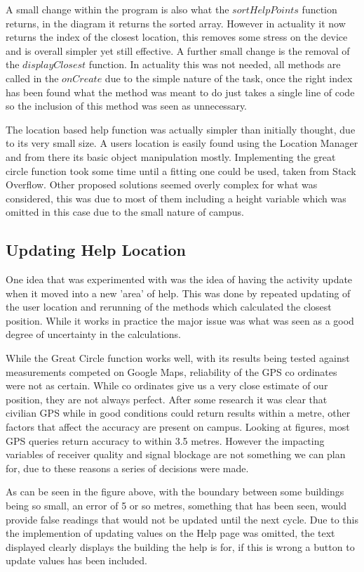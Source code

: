 A small change within the program is also what the $sortHelpPoints$ function returns, in the diagram it returns the sorted array. However in actuality it now returns the index of the closest location, this removes some stress on the device and is overall simpler yet still effective. A further small change is the removal of the $displayClosest$ function. In actuality this was not needed, all methods are called in the $onCreate$ due to the simple nature of the task, once the right index has been found what the method was meant to do just takes a single line of code so the inclusion of this method was seen as unnecessary.

The location based help function was actually simpler than initially thought, due to its very small size. A users location is easily found using the Location Manager and from there its basic object manipulation mostly. Implementing the great circle function took some time until a fitting one could be used, taken from Stack Overflow. Other proposed solutions seemed overly complex for what was considered, this was due to most of them including a height variable which was omitted in this case due to the small nature of campus. 

\subsection{Updating Help Location}
One idea that was experimented with was the idea of having the activity update when it moved into a new 'area' of help. This was done by repeated updating of the user location and rerunning of the methods which calculated the closest position. While it works in practice the major issue was what was seen as a good degree of uncertainty in the calculations.

While the Great Circle function works well, with its results being tested against measurements competed on Google Maps, reliability of the GPS co ordinates were not as certain. While co ordinates give us a very close estimate of our position, they are not always perfect. After some research it was clear that civilian GPS while in good conditions could return results within a metre, other factors that affect the accuracy are present on campus. Looking at figures, most GPS queries return accuracy to within 3.5 metres. However the impacting variables of receiver quality and signal blockage are not something we can plan for, due to these reasons a series of decisions were made.

As can be seen in the figure above, with the boundary between some buildings being so small, an error of 5 or so metres, something that has been seen, would provide false readings that would not be updated until the next cycle. Due to this the implemention of updating values on the Help page was omitted, the text displayed clearly displays the building the help is for, if this is wrong  a button to update values has been included.  

